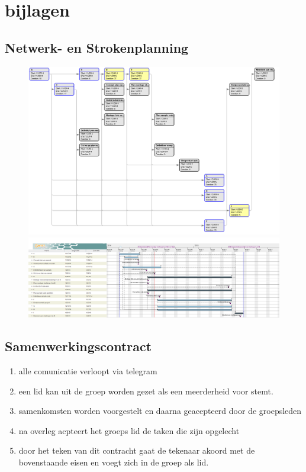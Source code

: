 \documentclass[oneside]{book}
\begin{document}
{\color{red}
\clearpage
\part*{bijlagen}
\chapter*{Netwerk- en Strokenplanning}
\begin{figure}[H]\begin{adjustwidth}{-3cm}{}
\includegraphics[scale=0.35]{image/netwerkplanning.png}
\includegraphics[scale=0.25]{image/strokenplanning.png}
\end{adjustwidth}\end{figure}
\chapter*{Samenwerkingscontract}
\begin{enumerate}
	\item alle comunicatie verloopt via telegram
	\item een lid kan uit de groep worden gezet als een meerderheid voor stemt.
	\item samenkomsten worden voorgestelt en daarna geacepteerd door de groepsleden
	\item na overleg acpteert het groeps lid de taken die zijn opgelecht
	\item door het teken van dit contracht gaat de tekenaar akoord met de bovenstaande eisen en voegt zich in de groep als lid.
\end{enumerate}
}
\end{document}

